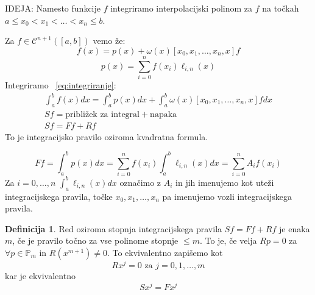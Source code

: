 \documentclass[a4paper,12pt]{article}
\theoremstyle{definition}
\newtheorem{defn}[counter]{Definicija}
\theoremstyle{remark}
\newcommand{\Pp}{\mathbb{P}}
\begin{document}
IDEJA: Namesto funkcije $f$ integriramo interpolacijski polinom za $f$ na točkah $a \leq x_0 < x_1 < \dots < x_n \leq b$.

Za $f \in \mathscr{C}^{n+1}([a, b])$ vemo že:
\begin{equation}
    f(x) = p(x) + \omega(x) [x_0, x_1, \dots, x_n, x] f  \label{eq:integriranje}
\end{equation}
\begin{equation*}
    p(x) = \sum_{i=0}^{n} f(x_i) \ell_{i, n}(x)
\end{equation*}
Integriramo ~\ref{eq:integriranje}:
\begin{gather*}
    \int_{a}^{b} f(x) dx = \int_{a}^{b} p(x) dx + \int_{a}^{b} \omega(x) [x_0, x_1, \dots, x_n, x] f dx \\
    Sf = \text{približek za integral} + \text{napaka} \\
    Sf = Ff + Rf
\end{gather*}
To je integracijsko pravilo oziroma kvadratna formula.

\begin{equation*}
    Ff = \int_{a}^{b} p(x) dx = \sum_{i=0}^{n} f(x_i) \int_{a}^{b} \ell_{i, n} (x) dx = \sum_{i=0}^{n} A_i f(x_i)
\end{equation*}
Za $i = 0, \dots, n$ $\int_{a}^{b} \ell_{i, n} (x) dx$ označimo z $A_i$ in jih imenujemo kot uteži integracijskega pravila, točke 
$x_0, x_1, \dots, x_n$ pa imenujemo vozli integracijskega pravila.

\begin{defn}
    Red oziroma stopnja integracijskega pravila $Sf = Ff + Rf$ je enaka $m$, če je pravilo točno za vse polinome stopnje $\leq m$. To je,
    če velja $Rp = 0$ za $\forall p \in \Pp_m$ in $R(x^{m+1}) \neq 0$. To ekvivalentno zapišemo kot
    \begin{equation*}
        Rx^j = 0 \text{ za } j = 0, 1, \dots, m
    \end{equation*}
    kar je ekvivalentno
    \begin{equation*}
        S x^j = F x^j
    \end{equation*}
\end{defn}
\end{document}
